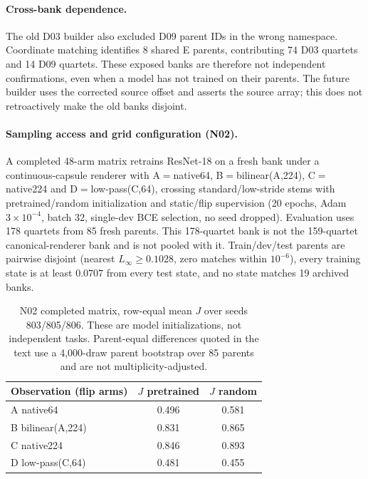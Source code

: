 \paragraph{Cross-bank dependence.} The old D03 builder also excluded D09 parent IDs in the wrong namespace. Coordinate matching identifies 8 shared E parents, contributing 74 D03 quartets and 14 D09 quartets. These exposed banks are therefore not independent confirmations, even when a model has not trained on their parents. The future builder uses the corrected source offset and asserts the source array; this does not retroactively make the old banks disjoint.
\paragraph{Sampling access and grid configuration (N02).} A completed 48-arm matrix retrains ResNet-18 on a fresh bank under a continuous-capsule renderer with A$=$native64, B$=$bilinear(A,224), C$=$native224 and D$=$low-pass(C,64), crossing standard/low-stride stems with pretrained/random initialization and static/flip supervision (20 epochs, Adam $3\times10^{-4}$, batch 32, single-dev BCE selection, no seed dropped). Evaluation uses 178 quartets from 85 fresh parents. This 178-quartet bank is not the 159-quartet canonical-renderer bank and is not pooled with it. Train/dev/test parents are pairwise disjoint (nearest $L_\infty\ge0.1028$, zero matches within $10^{-6}$), every training state is at least $0.0707$ from every test state, and no state matches 19 archived banks.
\begin{table}[t]\centering\small\begin{tabular}{@{}lcc@{}}\toprule
Observation (flip arms) & $J$ pretrained & $J$ random \\
\midrule
A native64 & 0.496 & 0.581 \\
B bilinear(A,224) & 0.831 & 0.865 \\
C native224 & 0.846 & 0.893 \\
D low-pass(C,64) & 0.481 & 0.455 \\
\bottomrule\end{tabular}\caption{N02 completed matrix, row-equal mean $J$ over seeds 803/805/806. These are model initializations, not independent tasks. Parent-equal differences quoted in the text use a 4,000-draw parent bootstrap over 85 parents and are not multiplicity-adjusted.}\end{table}
